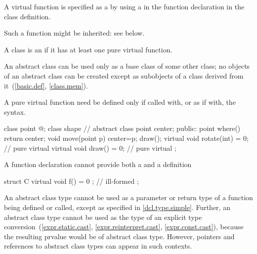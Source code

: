 \pnum
A virtual function is specified as
a  by using a
 in the function declaration
in the class definition.
\begin{note}
Such a function might be inherited: see below.
\end{note}
A class is an 
if it has at least one pure virtual function.
\begin{note}
An abstract class can be used only as a base class of some other class;
no objects of an abstract class can be created
except as subobjects of a class
derived from it~(\ref{basic.def}, \ref{class.mem}).
\end{note}
%
A pure virtual function need be defined only if called with, or as if
with, the 
syntax.
\begin{example}
\begin{codeblock}
class point { @\commentellip@ };
class shape {                   // abstract class
  point center;
public:
  point where() { return center; }
  void move(point p) { center=p; draw(); }
  virtual void rotate(int) = 0; // pure virtual
  virtual void draw() = 0;      // pure virtual
};
\end{codeblock}
\end{example}
\begin{note}
A function declaration cannot provide both a 
and a definition
\end{note}
\begin{example}
\begin{codeblock}
struct C {
  virtual void f() = 0 { };     // ill-formed
};
\end{codeblock}
\end{example}

\pnum
\begin{note}
An abstract class type cannot be used
as a parameter or return type of
a function being defined or called,
except as specified in \ref{dcl.type.simple}.
Further, an abstract class type cannot be used as
the type of an explicit type conversion~(\ref{expr.static.cast},
\ref{expr.reinterpret.cast}, \ref{expr.const.cast}),
because the resulting prvalue would be of abstract class type.
However, pointers and references to abstract class types
can appear in such contexts.
\end{note}

